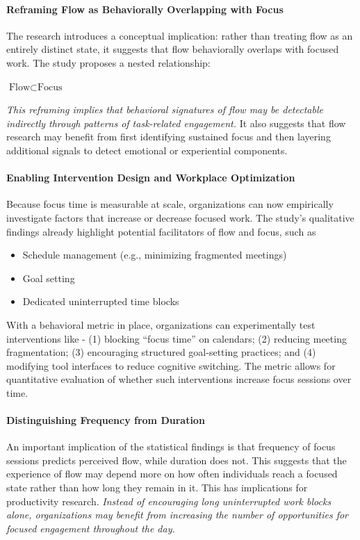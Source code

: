 \paragraph{Reframing Flow as Behaviorally Overlapping with Focus}
The research introduces a conceptual implication: rather than treating flow as an entirely distinct state, it suggests that flow behaviorally overlaps with focused work. The study proposes a nested relationship:
\begin{center}
    $\text{Flow} \subset \text{Focus}$
\end{center}
\textit{This reframing implies that behavioral signatures of flow may be detectable indirectly through patterns of task-related engagement.} It also suggests that flow research may benefit from first identifying sustained focus and then layering additional signals to detect emotional or experiential components.

\paragraph{Enabling Intervention Design and Workplace Optimization}

Because focus time is measurable at scale, organizations can now empirically investigate factors that increase or decrease focused work. The study’s qualitative findings already highlight potential facilitators of flow and focus, such as
\begin{itemize}
    \item Schedule management (e.g., minimizing fragmented meetings)
    \item Goal setting
    \item Dedicated uninterrupted time blocks
\end{itemize}
With a behavioral metric in place, organizations can experimentally test interventions like - (1) blocking “focus time” on calendars; (2) reducing meeting fragmentation; (3) encouraging structured goal-setting practices; and (4) modifying tool interfaces to reduce cognitive switching. The metric allows for quantitative evaluation of whether such interventions increase focus sessions over time.

\paragraph{Distinguishing Frequency from Duration}
An important implication of the statistical findings is that frequency of focus sessions predicts perceived flow, while duration does not. This suggests that the experience of flow may depend more on how often individuals reach a focused state rather than how long they remain in it. This has implications for productivity research. \textit{Instead of encouraging long uninterrupted work blocks alone, organizations may benefit from increasing the number of opportunities for focused engagement throughout the day.}

